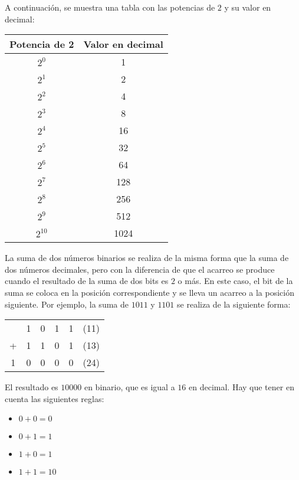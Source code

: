 A continuación, se muestra una tabla con las potencias de $2$ y su valor en decimal:
\begin{table}[H]
    \centering
    \begin{tabular}{|c|c|}
        \hline
        \textbf{Potencia de 2} & \textbf{Valor en decimal} \\ \hline
        $2^0$                 & 1                        \\ \hline
        $2^1$                 & 2                        \\ \hline
        $2^2$                 & 4                        \\ \hline
        $2^3$                 & 8                        \\ \hline
        $2^4$                 & 16                       \\ \hline
        $2^5$                 & 32                       \\ \hline
        $2^6$                 & 64                       \\ \hline
        $2^7$                 & 128                      \\ \hline
        $2^8$                 & 256                      \\ \hline
        $2^9$                 & 512                      \\ \hline
        $2^{10}$              & 1024                     \\ \hline
    \end{tabular}
\end{table}

\begin{metodo}
    La suma de dos números binarios se realiza de la misma forma que la suma de dos números decimales, pero con la diferencia de que el acarreo se produce cuando el resultado de la suma de dos bits es $2$ o más. En este caso, el bit de la suma se coloca en la posición correspondiente y se lleva un acarreo a la posición siguiente.
    Por ejemplo, la suma de $1011$ y $1101$ se realiza de la siguiente forma:
    \begin{table}[H]
        \centering
        \begin{tabular}{cccccc}
            & 1 & 0 & 1 & 1 & (11) \\
            + & 1 & 1 & 0 & 1 & (13) \\ \hline
            1 & 0 & 0 & 0 & 0 & (24)
        \end{tabular}
    \end{table}
    El resultado es $10000$ en binario, que es igual a $16$ en decimal.
    Hay que tener en cuenta las siguientes reglas:
    \begin{itemize}
        \item $0 + 0 = 0$
        \item $0 + 1 = 1$
        \item $1 + 0 = 1$
        \item $1 + 1 = 10$
    \end{itemize}
\end{metodo}


